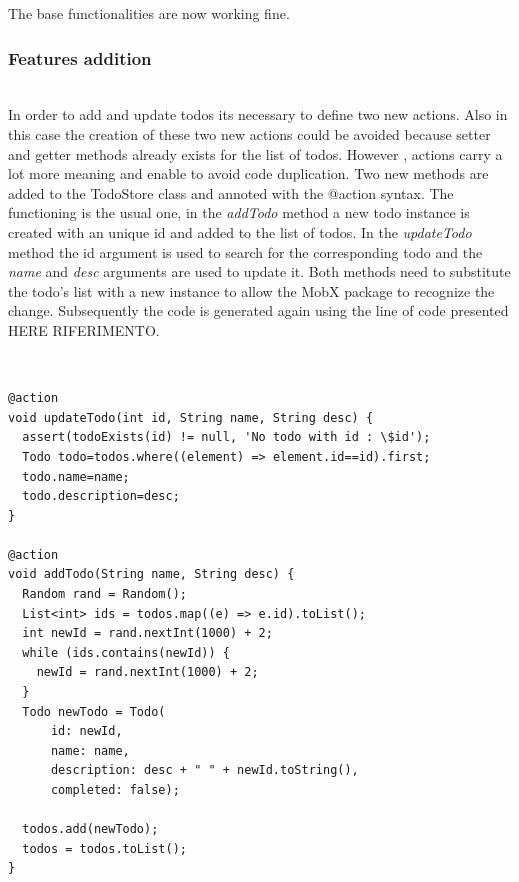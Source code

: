 The base functionalities are now working fine.
\subsubsection{Features addition} \mbox{}\\ \label{par:todo_app_inherited_widget_introduction}In order to add and update todos its necessary to define two new actions. Also in this case the creation of these two new actions could be avoided because setter and getter methods already exists for the list of todos. However , actions carry a lot more meaning and enable to avoid code duplication. Two new methods are added to the TodoStore class and annoted with the @action syntax. The functioning is the usual one, in the \textit{addTodo} method a new todo instance is created with an unique id and added to the list of todos. In the \textit{updateTodo} method the id argument is used to search for the corresponding todo and the \textit{name} and \textit{desc} arguments are used to update it. Both methods need to substitute the todo’s list with a new instance to allow the MobX package to recognize the change. Subsequently the code is generated again using the line of code presented HERE RIFERIMENTO.
\begin{code}
\mbox{}\\
 \mbox{}
		\label{code:2.14}
\begin{verbatim}
@action
void updateTodo(int id, String name, String desc) {
  assert(todoExists(id) != null, 'No todo with id : \$id');
  Todo todo=todos.where((element) => element.id==id).first;
  todo.name=name;
  todo.description=desc;
}

@action
void addTodo(String name, String desc) {
  Random rand = Random();
  List<int> ids = todos.map((e) => e.id).toList();
  int newId = rand.nextInt(1000) + 2;
  while (ids.contains(newId)) {
    newId = rand.nextInt(1000) + 2;
  }
  Todo newTodo = Todo(
      id: newId,
      name: name,
      description: desc + " " + newId.toString(),
      completed: false);

  todos.add(newTodo);
  todos = todos.toList();
}
\end{verbatim}
\mbox{}
\end{code}

